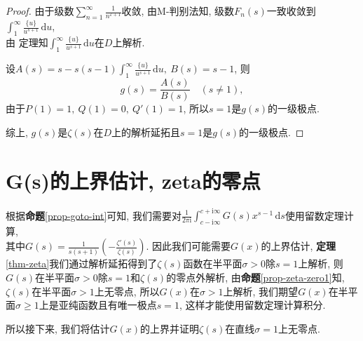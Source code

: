 \documentclass[12pt, a4paper, oneside]{ctexart}
\newtheorem{theorem}{定理}[section] %
\newtheorem{definition}{定义}[section]
\numberwithin{equation}{section}  %
\let\geq=\geqslant %
\let\epsilon=\varepsilon %
\def\C{\mathbb{C}}          %
\def\d{\mathrm{d}}          %
\def\i{\mathrm{i}}          %
\def\add{\vspace{1ex}}      %
\begin{document}
\begin{proof}
    由于级数$\sum_{n=1}^\infty\frac{1}{n^{\epsilon + 1}}$收敛, 由M-判别法知, 级数$F_n(s)$一致收敛到$\int_1^{\infty}\frac{\{u\}}{u^{s+1}}\,\d u$, \\由  定理知$\int_1^{\infty}\frac{\{u\}}{u^{s+1}}\,\d u$在$D$上解析.

    设$A(s) = s-s(s-1)\int_1^{\infty}\frac{\{u\}}{u^{s+1}}\,\d u,\ B(s) = s-1$, 则
    \begin{equation*}
    g(s) = \frac{A(s)}{B(s)}\quad(s\neq 1),
    \end{equation*}
    由于$P(1) = 1,\ Q(1) = 0,\ Q'(1) = 1$, 所以$s=1$是$g(s)$的一级极点.

    综上, $g(s)$是$\zeta(s)$在$D$上的解析延拓且$s=1$是$g(s)$的一级极点.
\end{proof}
\section{G(s)的上界估计, zeta的零点}
根据\textbf{命题}\ref{prop-goto-int}可知, 我们需要对$\frac{1}{2\pi\i}\int_{c-\i \infty}^{c+\i \infty}G(s)x^{s-1}\,\d s$使用留数定理计算,\\ 其中$G(s) = \frac{1}{s(s+1)}\left(-\frac{\zeta'(s)}{\zeta(s)}\right)$\add. 因此我们可能需要$G(x)$的上界估计, \textbf{定理}\ref{thm-zeta}我们通过解析延拓得到了$\zeta(s)$函数在半平面$\sigma > 0$除$s=1$上解析, 则$G(s)$在半平面$\sigma > 0$除$s=1$和$\zeta(s)$的零点外解析, 由\textbf{命题}\ref{prop-zeta-zero1}知, $\zeta(s)$在半平面$\sigma > 1$上无零点, 所以$G(x)$在$\sigma > 1$上解析, 我们期望$G(x)$在半平面$\sigma \geq 1$上是亚纯函数且有唯一极点$s=1$, 这样才能使用留数定理计算积分.

所以接下来, 我们将估计$G(x)$的上界并证明$\zeta(s)$在直线$\sigma =1$上无零点.

%
\end{document}
